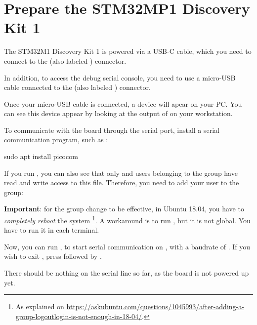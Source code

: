 \section{Prepare the STM32MP1 Discovery Kit 1}

The STM32M1 Discovery Kit 1 is powered via a USB-C cable, which you
need to connect to the  (also labeled )
connector.

In addition, to access the debug serial console, you need to use a
micro-USB cable connected to the  (also labeled
) connector.

Once your micro-USB cable is connected, a  device
will apear on your PC. You can see this device appear by looking at
the output of  on your workstation.

To communicate with the board through the serial port, install a
serial communication program, such as :

\begin{bashinput}
sudo apt install picocom
\end{bashinput}

If you run , you can also see that only
 and users belonging to the  group have read
and write access to this file. Therefore, you need to add your user to
the  group:


{\bf Important}: for the group change to be effective, in Ubuntu 18.04, you have to
{\em completely reboot} the system \footnote{As explained on
\url{https://askubuntu.com/questions/1045993/after-adding-a-group-logoutlogin-is-not-enough-in-18-04/}.}.
A workaround is to run , but it is not global.
You have to run it in each terminal.

Now, you can run , to start
serial communication on , with a baudrate of
. If you wish to exit , press
\code{[Ctrl][a]} followed by \code{[Ctrl][x]}.

There should be nothing on the serial line so far, as the board is not
powered up yet.
